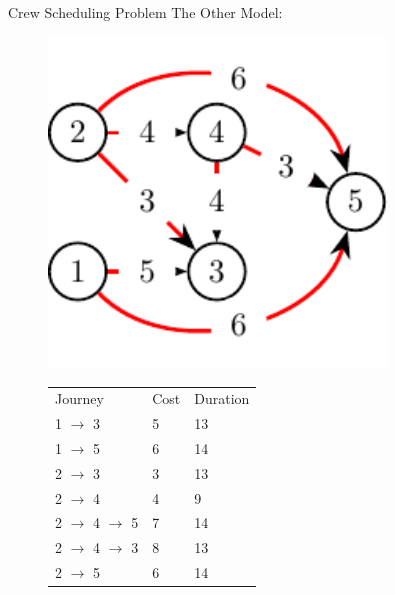 \documentclass{beamer}
\begin{document}
\begin{frame}{Crew Scheduling Problem}
The Other Model:
    \begin{figure}[!htb]
        \begin{minipage}{0.48\textwidth}
            \centering
                \begin{center}
                {
                \centering
                \includegraphics[width=0.8\textwidth]{graph.pdf}
                }
                \end{center}
        \end{minipage}
        \begin{minipage}{.48\textwidth}
            \begin{tabular}{l l l}
                Journey                           & Cost & Duration \\
                1 $\rightarrow$ 3                 & 5     & 13 \\
                1 $\rightarrow$ 5                 & 6     & 14 \\
                2 $\rightarrow$ 3                 & 3     & 13 \\
                2 $\rightarrow$ 4                 & 4     & 9  \\
                2 $\rightarrow$ 4 $\rightarrow$ 5 & 7     & 14 \\
                2 $\rightarrow$ 4 $\rightarrow$ 3 & 8     & 13 \\
                2 $\rightarrow$ 5                 & 6     & 14 \\
            \end{tabular}
        \end{minipage}
    \end{figure}
\end{frame}
\end{document}
